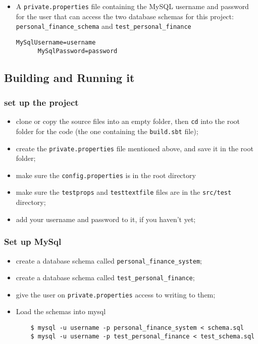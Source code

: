 \begin{itemize}
  \item
    A \texttt{private.properties} file containing the MySQL username and password for
    the user that can access the two database schemas for this project:
    \texttt{personal\_finance\_schema} and \texttt{test\_personal\_finance}

    \begin{lstlisting}[frame=single]
      MySqlUsername=username
      MySqlPassword=password
    \end{lstlisting}

\end{itemize}

\subsection{Building and Running it}
\subsubsection{set up the project}
\begin{itemize}
  \item
    clone or copy the source files into an empty folder, then \texttt{cd} into
    the root folder for the code (the one containing the \texttt{build.sbt} file);

  \item
    create the \texttt{private.properties} file mentioned above, and save it in
    the root folder;

  \item
    make sure the \texttt{config.properties} is in the root directory

  \item
    make sure the \texttt{testprops} and \texttt{testtextfile} files are in the
    \texttt{src/test} directory;

  \item
    add your username and password to it, if you haven't yet;
\end{itemize}


\subsubsection{Set up MySql}
\begin{itemize}
  \item
    create a database schema called \texttt{personal\_finance\_system};

  \item
    create a database schema called \texttt{test\_personal\_finance};

  \item
    give the user on \texttt{private.properties} access to writing to them;

  \item
    Load the schemas into mysql

    \begin{lstlisting}
    $ mysql -u username -p personal_finance_system < schema.sql
    $ mysql -u username -p test_personal_finance < test_schema.sql
    \end{lstlisting}
\end{itemize}


